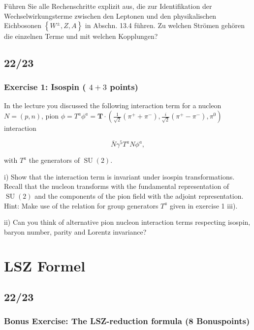\documentclass[10pt, letterpaper]{article}
\begin{document}
Führen Sie alle Rechenschritte explizit aus, die zur Identifikation der Wechselwirkungsterme zwischen den Leptonen und den physikalischen Eichbosonen $\left\{W^{ \pm}, Z, A\right\}$ in Abschn. 13.4 führen. Zu welchen Strömen gehören die einzelnen Terme und mit welchen Kopplungen? 


\pagebreak

\subsection{22/23}

\subsubsection{Exercise 1: Isospin ( $4+3$ points)}

{\color{blue}
In the lecture you discussed the following interaction term for a nucleon $N=(p, n)$, pion $\phi=T^a \phi^a=\mathbf{T} \cdot\left(\frac{1}{\sqrt{2}}\left(\pi^{+}+\pi^{-}\right), \frac{i}{\sqrt{2}}\left(\pi^{+}-\pi^{-}\right), \pi^0\right)$ interaction

$$
\bar{N} \gamma^5 T^a N \phi^a,
$$

with $T^a$ the generators of $\operatorname{SU}(2)$.

i) Show that the interaction term is invariant under isospin transformations. Recall that the nucleon transforms with the fundamental representation of $\operatorname{SU}(2)$ and the components of the pion field with the adjoint representation.
Hint: Make use of the relation for group generators $T^a$ given in exercise 1 iii).

ii) Can you think of alternative pion nucleon interaction terms respecting isospin, baryon number, parity and Lorentz invariance?
}

\pagebreak

\section{LSZ Formel}


\subsection{22/23}

\subsubsection{Bonus Exercise: The LSZ-reduction formula (8 Bonuspoints)}
\end{document}
